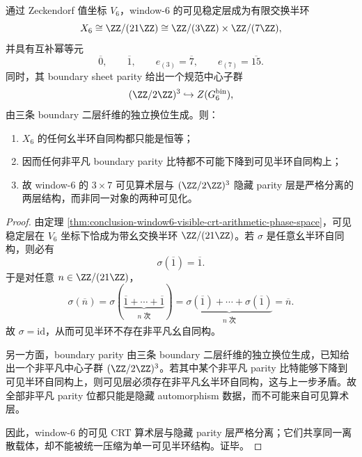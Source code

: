 \begin{theorem}\label{thm:conclusion-window6-visible-arithmetic-hidden-parity-absolute-internality}
通过 Zeckendorf 值坐标 \(V_6\)，window-\(6\) 的可见稳定层成为有限交换半环
\[
X_6\cong \ZZ/(21\ZZ)\cong \ZZ/(3\ZZ)\times \ZZ/(7\ZZ),
\]
并具有互补幂等元
\[
\overline 0,\qquad \overline 1,\qquad e_{(3)}=\overline 7,\qquad e_{(7)}=\overline{15}.
\]
同时，其 boundary sheet parity 给出一个规范中心子群
\[
(\ZZ/2\ZZ)^3\hookrightarrow Z(G_6^{\mathrm{bin}}),
\]
由三条 boundary 二层纤维的独立换位生成。则：
\begin{enumerate}
  \item \(X_6\) 的任何幺半环自同构都只能是恒等；
  \item 因而任何非平凡 boundary parity 比特都不可能下降到可见半环自同构上；
  \item 故 window-\(6\) 的 \(3\times 7\) 可见算术层与 \((\ZZ/2\ZZ)^3\) 隐藏 parity 层是严格分离的两层结构，而非同一对象的两种可见化。
\end{enumerate}
\end{theorem}

\begin{proof}
由定理 \ref{thm:conclusion-window6-visible-crt-arithmetic-phase-space}，可见稳定层在 \(V_6\) 坐标下恰成为带幺交换半环 \(\ZZ/(21\ZZ)\)。若 \(\sigma\) 是任意幺半环自同构，则必有
\[
\sigma(\overline 1)=\overline 1.
\]
于是对任意 \(n\in \ZZ/(21\ZZ)\)，
\[
\sigma(\overline n)
=
\sigma(\underbrace{\overline 1+\cdots+\overline 1}_{n\text{ 次}})
=
\underbrace{\sigma(\overline 1)+\cdots+\sigma(\overline 1)}_{n\text{ 次}}
=
\overline n.
\]
故 \(\sigma=\mathrm{id}\)，从而可见半环不存在非平凡幺自同构。

另一方面，boundary parity 由三条 boundary 二层纤维的独立换位生成，已知给出一个非平凡中心子群 \((\ZZ/2\ZZ)^3\)。若其中某个非平凡 parity 比特能够下降到可见半环自同构上，则可见层必须存在非平凡幺半环自同构，这与上一步矛盾。故全部非平凡 parity 位都只能是隐藏 automorphism 数据，而不可能来自可见算术层。

因此，window-\(6\) 的可见 CRT 算术层与隐藏 parity 层严格分离；它们共享同一离散载体，却不能被统一压缩为单一可见半环结构。证毕。
\end{proof}
